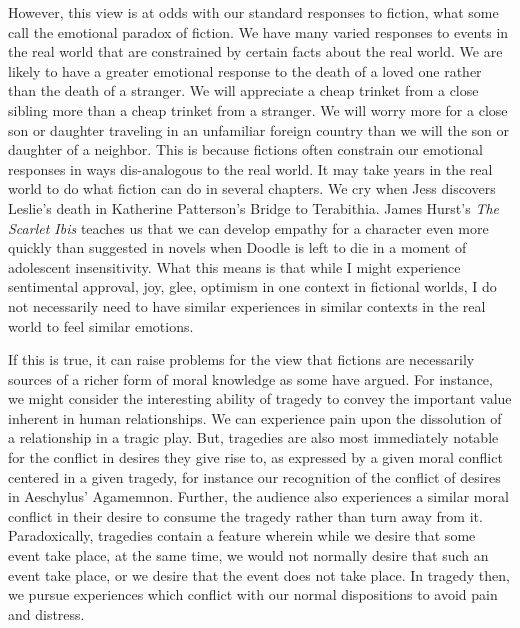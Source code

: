 \documentclass[phdthesis,12pt,final,a4paper]{wuthesis}
\theoremstyle{definition}
\theoremstyle{definition}
\theoremstyle{definition}
\theoremstyle{definition}
\theoremstyle{remark}
\begin{document}
However, this view is at odds with our standard responses to fiction, what some call the emotional paradox of fiction. We have many varied responses to events in the real world that are constrained by certain facts about the real world. We are likely to have a greater emotional response to the death of a loved one rather than the death of a stranger. We will appreciate a cheap trinket from a close sibling more than a cheap trinket from a stranger. We will worry more for a close son or daughter traveling in an unfamiliar foreign country than we will the son or daughter of a neighbor. This is because fictions often constrain our emotional responses in ways dis-analogous to the real world. It may take years in the real world to do what fiction can do in several chapters. We cry when Jess discovers Leslie's death in Katherine Patterson's Bridge to Terabithia. James Hurst's \emph{The Scarlet Ibis} teaches us that we can develop empathy for a character even more quickly than suggested in novels when Doodle is left to die in a moment of adolescent insensitivity. What this means is that while I might experience sentimental approval, joy, glee, optimism in one context in fictional worlds, I do not necessarily need to have similar experiences in similar contexts in the real world to feel similar emotions.

If this is true, it can raise problems for the view that fictions are necessarily sources of a richer form of moral knowledge as some have argued. For instance, we might consider the interesting ability of tragedy to convey the important value inherent in human relationships. We can experience pain upon the dissolution of a relationship in a tragic play. But, tragedies are also most immediately notable for the conflict in desires they give rise to, as expressed by a given moral conflict centered in a given tragedy, for instance our recognition of the conflict of desires in Aeschylus' Agamemnon. Further, the audience also experiences a similar moral conflict in their desire to consume the tragedy rather than turn away from it. Paradoxically, tragedies contain a feature wherein while we desire that some event take place, at the same time, we would not normally desire that such an event take place, or we desire that the event does not take place. In tragedy then, we pursue experiences which conflict with our normal dispositions to avoid pain and distress.
\end{document}
